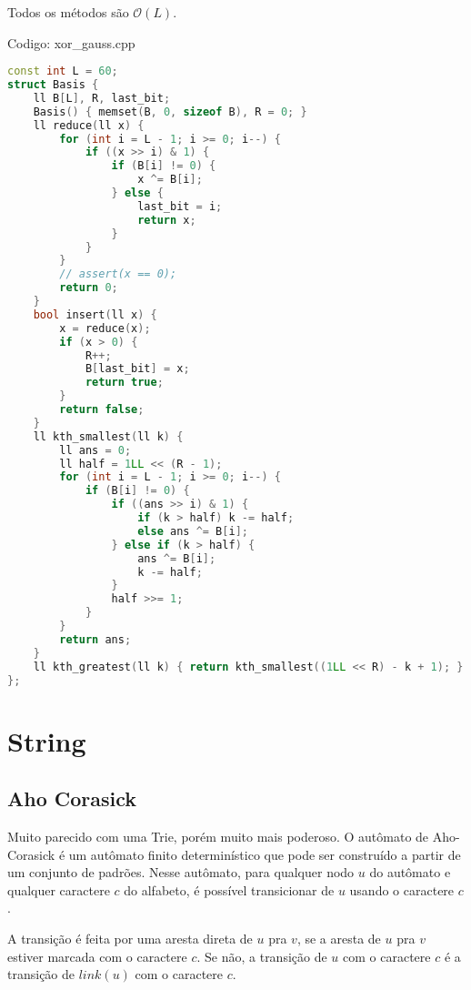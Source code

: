 \documentclass[10pt, a4paper, oneside]{book}
\begin{document}
Todos os métodos são $\mathcal{O}(L)$.
\hfill

Codigo: xor\_gauss.cpp

\begin{lstlisting}[language=C++]
const int L = 60;
struct Basis {
    ll B[L], R, last_bit;
    Basis() { memset(B, 0, sizeof B), R = 0; }
    ll reduce(ll x) {
        for (int i = L - 1; i >= 0; i--) {
            if ((x >> i) & 1) {
                if (B[i] != 0) {
                    x ^= B[i];
                } else {
                    last_bit = i;
                    return x;
                }
            }
        }
        // assert(x == 0);
        return 0;
    }
    bool insert(ll x) {
        x = reduce(x);
        if (x > 0) {
            R++;
            B[last_bit] = x;
            return true;
        }
        return false;
    }
    ll kth_smallest(ll k) {
        ll ans = 0;
        ll half = 1LL << (R - 1);
        for (int i = L - 1; i >= 0; i--) {
            if (B[i] != 0) {
                if ((ans >> i) & 1) {
                    if (k > half) k -= half;
                    else ans ^= B[i];
                } else if (k > half) {
                    ans ^= B[i];
                    k -= half;
                }
                half >>= 1;
            }
        }
        return ans;
    }
    ll kth_greatest(ll k) { return kth_smallest((1LL << R) - k + 1); }
};
\end{lstlisting}
\hfill

\newpage

%
%
%
%

\chapter{String}

\section{Aho Corasick}


Muito parecido com uma Trie, porém muito mais poderoso. O autômato de Aho-Corasick é um autômato finito determinístico que pode ser construído a partir de um conjunto de padrões. Nesse autômato, para qualquer nodo $u$ do autômato e qualquer caractere $c$ do alfabeto, é possível transicionar de $u$ usando o caractere $c$.



A transição é feita por uma aresta direta de $u$ pra $v$, se a aresta de $u$ pra $v$ estiver marcada com o caractere $c$. Se não, a transição de $u$ com o caractere $c$ é a transição de $link(u)$ com o caractere $c$.
\end{document}
